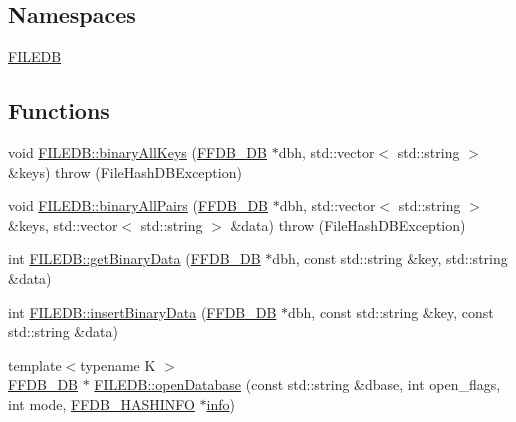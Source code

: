 \subsection*{Namespaces}
\begin{DoxyCompactItemize}
\item 
 \mbox{\hyperlink{namespaceFILEDB}{F\+I\+L\+E\+DB}}
\end{DoxyCompactItemize}
\subsection*{Functions}
\begin{DoxyCompactItemize}
\item 
void \mbox{\hyperlink{namespaceFILEDB_a208d694e308a85bd3b04277ffe369377}{F\+I\+L\+E\+D\+B\+::binary\+All\+Keys}} (\mbox{\hyperlink{adat-devel_2other__libs_2filedb_2filehash_2ffdb__db_8h_a0b27b956926453a7a8141ea8e10f0df8}{F\+F\+D\+B\+\_\+\+DB}} $\ast$dbh, std\+::vector$<$ std\+::string $>$ \&keys)  throw (\+File\+Hash\+D\+B\+Exception)
\item 
void \mbox{\hyperlink{namespaceFILEDB_ac242fd8f47258576482a692de8d1eaf3}{F\+I\+L\+E\+D\+B\+::binary\+All\+Pairs}} (\mbox{\hyperlink{adat-devel_2other__libs_2filedb_2filehash_2ffdb__db_8h_a0b27b956926453a7a8141ea8e10f0df8}{F\+F\+D\+B\+\_\+\+DB}} $\ast$dbh, std\+::vector$<$ std\+::string $>$ \&keys, std\+::vector$<$ std\+::string $>$ \&data)  throw (\+File\+Hash\+D\+B\+Exception)
\item 
int \mbox{\hyperlink{namespaceFILEDB_a0de8699301294566d0e11786f4016a2a}{F\+I\+L\+E\+D\+B\+::get\+Binary\+Data}} (\mbox{\hyperlink{adat-devel_2other__libs_2filedb_2filehash_2ffdb__db_8h_a0b27b956926453a7a8141ea8e10f0df8}{F\+F\+D\+B\+\_\+\+DB}} $\ast$dbh, const std\+::string \&key, std\+::string \&data)
\item 
int \mbox{\hyperlink{namespaceFILEDB_a517749615adc5aa798175fb429115366}{F\+I\+L\+E\+D\+B\+::insert\+Binary\+Data}} (\mbox{\hyperlink{adat-devel_2other__libs_2filedb_2filehash_2ffdb__db_8h_a0b27b956926453a7a8141ea8e10f0df8}{F\+F\+D\+B\+\_\+\+DB}} $\ast$dbh, const std\+::string \&key, const std\+::string \&data)
\item 
{\footnotesize template$<$typename K $>$ }\\\mbox{\hyperlink{adat-devel_2other__libs_2filedb_2filehash_2ffdb__db_8h_a0b27b956926453a7a8141ea8e10f0df8}{F\+F\+D\+B\+\_\+\+DB}} $\ast$ \mbox{\hyperlink{namespaceFILEDB_a9ed602db52c9c9d3bbf1324426376c72}{F\+I\+L\+E\+D\+B\+::open\+Database}} (const std\+::string \&dbase, int open\+\_\+flags, int mode, \mbox{\hyperlink{structFFDB__HASHINFO}{F\+F\+D\+B\+\_\+\+H\+A\+S\+H\+I\+N\+FO}} $\ast$\mbox{\hyperlink{structinfo}{info}})

\end{DoxyCompactItemize}
